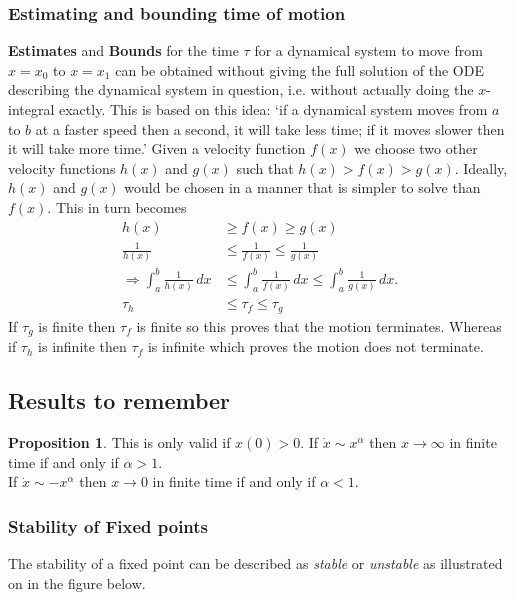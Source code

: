 \documentclass[12pt, a4paper]{article}
\newcommand{\imply}{\Rightarrow}
\theoremstyle{definition}
\newtheorem{proposition}{Proposition}
\theoremstyle{plain}
\begin{document}
\subsubsection{Estimating and bounding time of motion}

\textbf{Estimates} and \textbf{Bounds} for the time $\tau$ for a dynamical system to move from $x = x_0$ to $x = x_1$ can be obtained without giving the full solution of the ODE describing the dynamical system in question, i.e. without actually doing the $x$-integral exactly. This is based on this idea: `if a dynamical system moves from $a$ to $b$ at a faster speed then a second, it will take less time; if it moves slower then it will take more time.' Given a velocity function $f(x)$ we choose two other velocity functions $h(x)$ and $g(x)$ such that $h(x)>f(x)>g(x).$ Ideally, $h(x)$ and $g(x)$ would be chosen in a manner that is simpler to solve than $f(x).$
This in turn becomes 
$$\begin{aligned}
h(x)&\geq f(x)\geq g(x) \\
\frac{1}{h(x)}&\leq \frac{1}{f(x)}\leq \frac{1}{g(x)}\\
\imply \int_{a}^{b} \frac{1}{h(x)} \, dx &\leq  \int_{a}^{b} \frac{1}{f(x)} \, dx \leq \int_{a}^{b} \frac{1}{g(x)} \, dx. \\
\tau_h &\leq \tau_f \leq \tau_g
\end{aligned}$$ If $\tau_g$ is finite then $\tau_f$ is finite so this proves that the motion terminates. Whereas if $\tau_h$ is infinite then $\tau_f$ is infinite which proves the motion does not terminate.

\subsection{Results to remember}

\begin{proposition}
This is only valid if $x(0)>0.$
If $\dot{x}\sim x^{\alpha}$ then $x\to \infty$ in finite time if and only if $\alpha>1.$ \\
If $\dot{x}\sim -x^{\alpha}$ then $x\to 0$ in finite time if and only if $\alpha<1.$ \\
\end{proposition}

\subsubsection{Stability of Fixed points}

The stability of a fixed point can be described as \textit{stable} or \textit{unstable} as illustrated on in the figure below.
\end{document}
